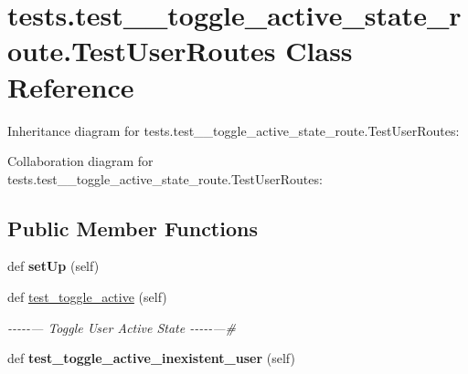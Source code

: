 \hypertarget{classtests_1_1test__8__toggle__active__state__route_1_1_test_user_routes}{}\section{tests.\+test\+\_\+\_\+toggle\+\_\+active\+\_\+state\+\_\+route.\+Test\+User\+Routes Class Reference}
\label{classtests_1_1test__8__toggle__active__state__route_1_1_test_user_routes}


Inheritance diagram for tests.\+test\+\_\+\_\+toggle\+\_\+active\+\_\+state\+\_\+route.\+Test\+User\+Routes\+:


Collaboration diagram for tests.\+test\+\_\+\_\+toggle\+\_\+active\+\_\+state\+\_\+route.\+Test\+User\+Routes\+:
\subsection*{Public Member Functions}
\begin{DoxyCompactItemize}
\item 
\mbox{\label{classtests_1_1test__8__toggle__active__state__route_1_1_test_user_routes_ace5e2927f43fc2c7e516df32d2d1d393}} 
def {\bfseries set\+Up} (self)
\item 
\mbox{\label{classtests_1_1test__8__toggle__active__state__route_1_1_test_user_routes_afdcfbebc23000d71f55895db555adb29}} 
def \hyperlink{classtests_1_1test__8__toggle__active__state__route_1_1_test_user_routes_afdcfbebc23000d71f55895db555adb29}{test\+\_\+toggle\+\_\+active} (self)
\begin{DoxyCompactList}\small\item\em -\/-\/-\/-\/-\/--- Toggle User Active State -\/-\/-\/-\/-\/---\# \end{DoxyCompactList}\item 
\mbox{\label{classtests_1_1test__8__toggle__active__state__route_1_1_test_user_routes_a7d0dd3e2a68d3485e9bd593c836c4d7e}} 
def {\bfseries test\+\_\+toggle\+\_\+active\+\_\+inexistent\+\_\+user} (self)
\end{DoxyCompactItemize}

